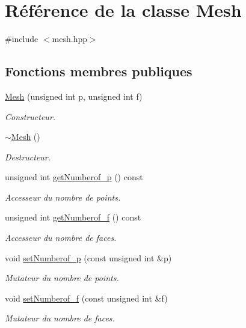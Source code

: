 \hypertarget{class_mesh}{\section{Référence de la classe Mesh}
\label{class_mesh}
}


{\ttfamily \#include $<$mesh.\-hpp$>$}

\subsection*{Fonctions membres publiques}
\begin{DoxyCompactItemize}
\item 
\hyperlink{class_mesh_a88e83e4a86e03f23069bfe397de58389}{Mesh} (unsigned int p, unsigned int f)
\begin{DoxyCompactList}\small\item\em Constructeur. \end{DoxyCompactList}\item 
\hyperlink{class_mesh_a5efe4da1a4c0971cfb037bd70304c303}{$\sim$\-Mesh} ()
\begin{DoxyCompactList}\small\item\em Destructeur. \end{DoxyCompactList}\item 
unsigned int \hyperlink{class_mesh_a9e33572dbe48c4d96f98c2731fd97dcd}{get\-Numberof\-\_\-p} () const 
\begin{DoxyCompactList}\small\item\em Accesseur du nombre de points. \end{DoxyCompactList}\item 
unsigned int \hyperlink{class_mesh_ac5fdb24c0693a8d02c739cd254b826e1}{get\-Numberof\-\_\-f} () const 
\begin{DoxyCompactList}\small\item\em Accesseur du nombre de faces. \end{DoxyCompactList}\item 
void \hyperlink{class_mesh_a76b45fbfdfa33d0f0285f86a918192ba}{set\-Numberof\-\_\-p} (const unsigned int \&p)
\begin{DoxyCompactList}\small\item\em Mutateur du nombre de points. \end{DoxyCompactList}\item 
void \hyperlink{class_mesh_ad1b46c508d09b76ac575564fcaa24931}{set\-Numberof\-\_\-f} (const unsigned int \&f)
\begin{DoxyCompactList}\small\item\em Mutateur du nombre de faces. \end{DoxyCompactList}\end{DoxyCompactItemize}
